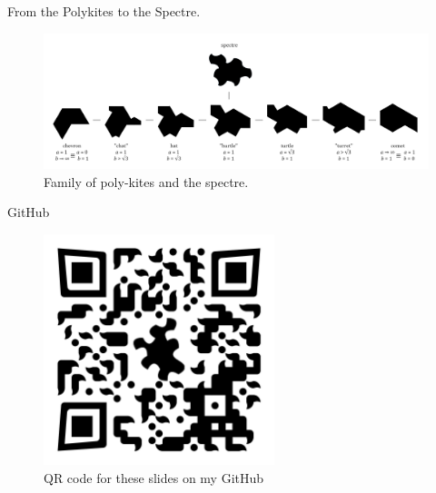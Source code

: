 \documentclass{beamer}
\begin{document}
\begin{frame}{From the Polykites to the Spectre.}
    \begin{figure}
        \centering
        \includegraphics[width=\textwidth]{images/polykite-family/monotile-continuum.png}
        \caption{Family of poly-kites and the spectre. \cite{steckles2023aperiodicmonotile}}
        \label{fig:poly-kites-spectre}
    \end{figure}
\end{frame}

%     

\begin{frame}{GitHub}
    \begin{figure}
        \centering
        \includegraphics[width=0.6\textwidth]{images/qr-codes/tilling-presentation-github.png}
        \caption{QR code for these slides on my GitHub}
        \label{fig:github-qrcode}
    \end{figure}
\end{frame}
\end{document}
